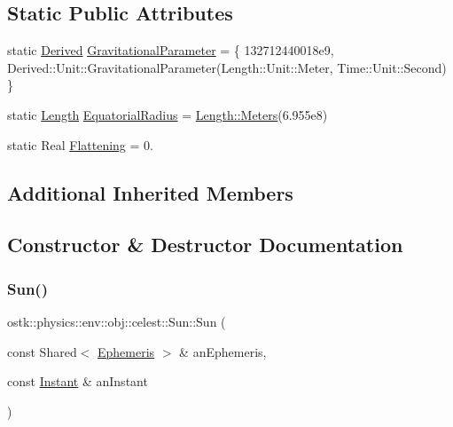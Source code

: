 \subsection*{Static Public Attributes}
\begin{DoxyCompactItemize}
\item 
static \hyperlink{classostk_1_1physics_1_1units_1_1_derived}{Derived} \hyperlink{classostk_1_1physics_1_1env_1_1obj_1_1celest_1_1_sun_ab53baca68d9a8eaef2aa734011e29cc0}{Gravitational\+Parameter} = \{ 132712440018e9, Derived\+::\+Unit\+::\+Gravitational\+Parameter(\+Length\+::\+Unit\+::\+Meter, Time\+::\+Unit\+::\+Second) \}
\item 
static \hyperlink{classostk_1_1physics_1_1units_1_1_length}{Length} \hyperlink{classostk_1_1physics_1_1env_1_1obj_1_1celest_1_1_sun_a158d85a536619dc2f9550919a39b90a2}{Equatorial\+Radius} = \hyperlink{classostk_1_1physics_1_1units_1_1_length_ad227977ce00756791595796a0dd5ddd7}{Length\+::\+Meters}(6.\+955e8)
\item 
static Real \hyperlink{classostk_1_1physics_1_1env_1_1obj_1_1celest_1_1_sun_a04e467a3bb16cbaf9ec89cb63f556ddc}{Flattening} = 0.
\end{DoxyCompactItemize}
\subsection*{Additional Inherited Members}


\subsection{Constructor \& Destructor Documentation}
\mbox{\label{classostk_1_1physics_1_1env_1_1obj_1_1celest_1_1_sun_ad2301582b97279e3ed9c91bca52a458e}} 
\subsubsection{\texorpdfstring{Sun()}{Sun()}}
{\footnotesize\ttfamily ostk\+::physics\+::env\+::obj\+::celest\+::\+Sun\+::\+Sun (\begin{DoxyParamCaption}\item[{const Shared$<$ \hyperlink{classostk_1_1physics_1_1env_1_1_ephemeris}{Ephemeris} $>$ \&}]{an\+Ephemeris,  }\item[{const \hyperlink{classostk_1_1physics_1_1time_1_1_instant}{Instant} \&}]{an\+Instant }\end{DoxyParamCaption})}

